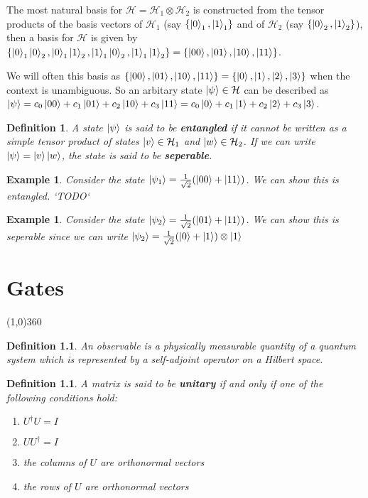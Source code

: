 \documentclass[12pt,twoside]{report}
\newtheorem{defn}[subsection]{Definition}
\newtheorem{eg}[subsection]{Example}
\begin{document}
The most natural basis for $\mathcal{H} = \mathcal{H}_1 \otimes \mathcal{H}_2$ is constructed from the tensor products of the basis vectors of $\mathcal{H}_1$ (say $\{ \ket{0}_1, \ket{1}_1 \}$ and of $\mathcal{H}_2$ (say $\{ \ket{0}_2, \ket{1}_2 \}$), then a basis for $\mathcal{H}$ is given by $\{ \ket{0}_1\ket{0}_2, \ket{0}_1\ket{1}_2, \ket{1}_1\ket{0}_2, \ket{1}_1\ket{1}_2 \} \\ = \{ \ket{00}, \ket{01}, \ket{10}, \ket{11} \}$.

We will often this basis as $\{ \ket{00}, \ket{01}, \ket{10}, \ket{11} \} = \{ \ket{0}, \ket{1}, \ket{2}, \ket{3} \}$ when the context is unambiguous. So an arbitary state $\ket{\psi} \in \mathcal{H}$ can be described as $\ket{\psi} = c_0 \ket{00} + c_1 \ket{01} + c_2 \ket{10} + c_3 \ket{11} = c_0 \ket{0} + c_1 \ket{1} + c_2 \ket{2} + c_3 \ket{3}$.

\begin{defn}
A state $\ket{\psi}$ is said to be \textbf{entangled} if it cannot be written as a simple tensor product of states $\ket{v} \in \mathcal{H}_1$ and $\ket{w} \in \mathcal{H}_2$. If we can write $\ket{\psi} = \ket{v}\ket{w}$, the state is said to be \textbf{seperable}.
\end{defn}

\begin{eg}
Consider the state $\ket{\psi_1} = \frac{1}{\sqrt{2}} (\ket{00} + \ket{11})$. We can show this is entangled. `TODO`
\end{eg}

\begin{eg}
Consider the state $\ket{\psi_2} = \frac{1}{\sqrt{2}} (\ket{01} + \ket{11})$. We can show this is seperable since we can write $\ket{\psi_2} = \frac{1}{\sqrt{2}} (\ket{0} + \ket{1}) \otimes \ket{1}$
\end{eg}


\chapter{Gates}
\line(1,0){360} \\

\begin{defn}
    An observable is a physically measurable quantity of a quantum system which is represented by a self-adjoint operator on a Hilbert space.
\end{defn}

\begin{defn}
    A matrix is said to be \textbf{unitary} if and only if one of the following conditions hold:
    \begin{enumerate}
        \item $U^\dagger U = I$
        \item $U U^\dagger = I$
        \item the columns of $U$ are orthonormal vectors
        \item the rows of $U$ are orthonormal vectors
    \end{enumerate}
\end{defn}
\end{document}
